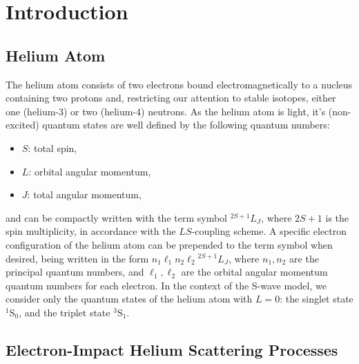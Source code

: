 \documentclass[]{article}
\def\mainmatter{%
    \pagenumbering{arabic}
    \setcounter{page}{1}
    \setcounter{section}{0}
    \renewcommand{\thesection}{\arabic{section}}
}%
\begin{document}
\clearpage

\mainmatter

\section{Introduction}
\label{sec:in}


\subsection{Helium Atom}
\label{sec:in-he}


The helium atom consists of two electrons bound electromagnetically to a nucleus
containing two protons and, restricting our attention to stable isotopes, either
one (helium-3) or two (helium-4) neutrons.
As the helium atom is light, it's (non-excited) quantum states are well defined
by the following quantum numbers:
\begin{itemize}
\item $S$: total spin,
\item $L$: orbital angular momentum,
\item $J$: total angular momentum,
\end{itemize}
and can be compactly written with the term symbol ${}^{2S + 1}L_{J}$, where
$2S + 1$ is the spin multiplicity, in accordance with the $LS$-coupling scheme.
A specific electron configuration of the helium atom can be prepended to the
term symbol when desired, being written in the form
$n_{1}\ell_{1} n_{2}\ell_{2} {}^{2S + 1}L_{J}$, where $n_{1}, n_{2}$ are the
principal quantum numbers, and $\ell_{1}, \ell_{2}$ are the orbital angular
momentum quantum numbers for each electron.
In the context of the S-wave model, we consider only the quantum states of the
helium atom with $L = 0$: the singlet state ${}^{1}\mathrm{S}_{0}$, and the
triplet state ${}^{3}\mathrm{S}_{1}$.

\subsection{Electron-Impact Helium Scattering Processes}
\label{sec:in-proc}

\end{document}
